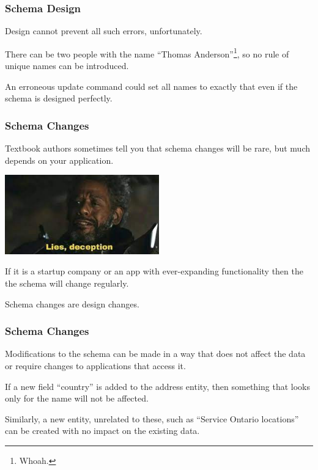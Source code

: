 \begin{frame}
\frametitle{Schema Design}

Design cannot prevent all such errors, unfortunately. 

There can be two people with the name ``Thomas Anderson''\footnote{Whoah.}, so no rule of unique names can be introduced.

An erroneous update command could set all names to exactly that even if the schema is designed perfectly.


\end{frame}




\begin{frame}
\frametitle{Schema Changes}

Textbook authors sometimes tell you that schema changes will be rare, but much depends on your application. 

\begin{center}
	\includegraphics[width=0.5\textwidth]{images/lies.jpg}
\end{center}

If it is a startup company or an app with ever-expanding functionality then the the schema will change regularly. 

Schema changes are design changes.

\end{frame}



\begin{frame}
\frametitle{Schema Changes}

Modifications to the schema can be made in a way that does not affect the data or require changes to applications that access it. 

If a new field ``country'' is added to the address entity, then something that looks only for the name will not be affected. 

Similarly, a new entity, unrelated to these, such as ``Service Ontario locations'' can be created with no impact on the existing data.

\end{frame}



